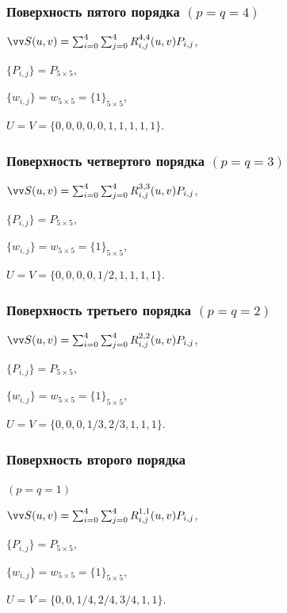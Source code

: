 \documentclass[10pt]{beamer}
\begin{document}
\begin{frame}\frametitle{Поверхность пятого порядка $(p=q=4)$}
	
	
	
	{
	}{
		$\VV S(u,v)=\sum_{i=0}^4\sum_{j=0}^4R_{i,j}^{4,4}(u,v)P_{i,j}$,
		
		$\{P_{i,j}\}=P_{5\times5}$,
		
		$\{w_{i,j}\}=w_{5\times5}=\{1\}_{5\times5}$,
		
		$U=V=\{0,0,0,0,0,1,1,1,1,1\}$.
	}
	
\end{frame}

\begin{frame}\frametitle{Поверхность четвертого порядка $(p=q=3)$}
	
	
	
	{
	}{
		$\VV S(u,v)=\sum_{i=0}^4\sum_{j=0}^4R_{i,j}^{3,3}(u,v)P_{i,j}$,
		
		$\{P_{i,j}\}=P_{5\times5}$,
		
		$\{w_{i,j}\}=w_{5\times5}=\{1\}_{5\times5}$,
		
		$U=V=\{0,0,0,0,1/2,1,1,1,1\}$.
	}
	
\end{frame}

\begin{frame}\frametitle{Поверхность третьего порядка $(p=q=2)$}
	
	
	
	{
	}{
		$\VV S(u,v)=\sum_{i=0}^4\sum_{j=0}^4R_{i,j}^{2,2}(u,v)P_{i,j}$,
		
		$\{P_{i,j}\}=P_{5\times5}$,
		
		$\{w_{i,j}\}=w_{5\times5}=\{1\}_{5\times5}$,
		
		$U=V=\{0,0,0,1/3,2/3,1,1,1\}$.
	}
	
\end{frame} 

\begin{frame}\frametitle{Поверхность второго порядка} $(p=q=1)$
	
	
	
	{
	}{
		$\VV S(u,v)=\sum_{i=0}^4\sum_{j=0}^4R_{i,j}^{1,1}(u,v)P_{i,j}$,
		
		$\{P_{i,j}\}=P_{5\times5}$,
		
		$\{w_{i,j}\}=w_{5\times5}=\{1\}_{5\times5}$,
		
		$U=V=\{0,0,1/4,2/4,3/4,1,1\}$.
	}
	
\end{frame} 
\end{document}
